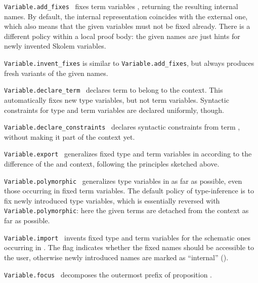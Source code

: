 \begin{isabellebody}
\begin{isamarkuptext}
  \begin{description}

  \item \verb|Variable.add_fixes|~ fixes term
  variables , returning the resulting internal names.  By
  default, the internal representation coincides with the external
  one, which also means that the given variables must not be fixed
  already.  There is a different policy within a local proof body: the
  given names are just hints for newly invented Skolem variables.

  \item \verb|Variable.invent_fixes| is similar to \verb|Variable.add_fixes|, but always produces fresh variants of the given
  names.

  \item \verb|Variable.declare_term|~ declares term
   to belong to the context.  This automatically fixes new
  type variables, but not term variables.  Syntactic constraints for
  type and term variables are declared uniformly, though.

  \item \verb|Variable.declare_constraints|~ declares
  syntactic constraints from term , without making it part
  of the context yet.

  \item \verb|Variable.export|~ generalizes
  fixed type and term variables in  according to the
  difference of the  and  context,
  following the principles sketched above.

  \item \verb|Variable.polymorphic|~ generalizes type
  variables in  as far as possible, even those occurring
  in fixed term variables.  The default policy of type-inference is to
  fix newly introduced type variables, which is essentially reversed
  with \verb|Variable.polymorphic|: here the given terms are detached
  from the context as far as possible.

  \item \verb|Variable.import|~ invents fixed
  type and term variables for the schematic ones occurring in .  The  flag indicates whether the fixed names
  should be accessible to the user, otherwise newly introduced names
  are marked as ``internal'' ().

  \item \verb|Variable.focus|~ decomposes the outermost \isa{{\isasymAnd}} prefix of proposition .


\end{description}
\end{isamarkuptext}
\end{isabellebody}
